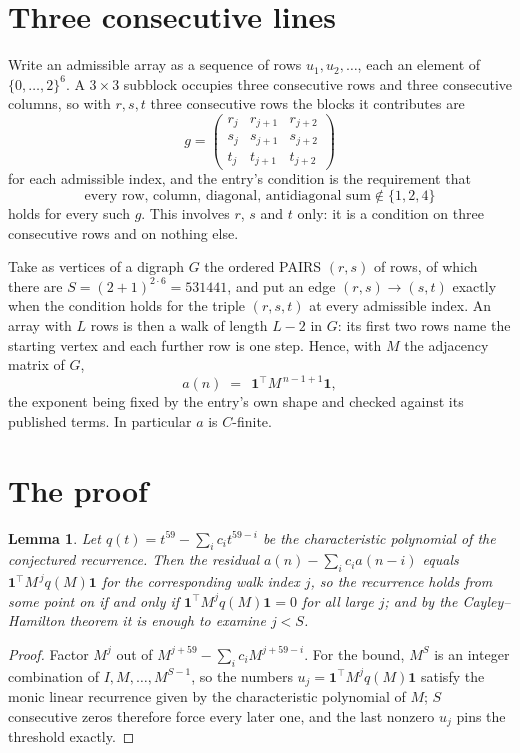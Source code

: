 \documentclass[11pt,a4paper]{article}
\theoremstyle{plain}
\newtheorem{lemma}[theorem]{Lemma}
\theoremstyle{definition}
\begin{document}
\section{Three consecutive lines}

Write an admissible array as a sequence of rows $u_1,u_2,\dots$, each an element of
$\{0,\dots,2\}^{6}$. A $3\times3$ subblock occupies three consecutive rows and
three consecutive columns, so with $r,s,t$ three consecutive rows the blocks it
contributes are
\[
g=\begin{pmatrix}r_j&r_{j+1}&r_{j+2}\\ s_j&s_{j+1}&s_{j+2}\\ t_j&t_{j+1}&t_{j+2}\end{pmatrix}
\]
for each admissible index, and the entry's condition is the requirement that
\[
\text{every row, column, diagonal, antidiagonal sum} \notin \{1,2,4\}
\]
holds for every such $g$. This involves $r$, $s$ and $t$ only: it is a condition on
three consecutive rows and on nothing else.

Take as vertices of a digraph $G$ the ordered PAIRS $(r,s)$ of rows, of which there are
$S=(2+1)^{2\cdot6}=531441$, and put an edge $(r,s)\to(s,t)$ exactly when the condition
holds for the triple $(r,s,t)$ at every admissible index. An array with $L$ rows is then a
walk of length $L-2$ in $G$: its first two rows name the starting vertex and each further
row is one step. Hence, with $M$ the adjacency matrix of $G$,
\[
a(n)\;=\;\,\mathbf{1}^{\!\top}M^{\,n-1+1}\mathbf{1},
\]
the exponent being fixed by the entry's own shape and checked against its published terms.
In particular $a$ is $C$-finite.

\section{The proof}

\begin{lemma}\label{lem:crit}
Let $q(t)=t^{59}-\sum_i c_it^{59-i}$ be the characteristic polynomial of the
conjectured recurrence. Then the residual $a(n)-\sum_ic_ia(n-i)$ equals
$\mathbf{1}^{\!\top}M^{\,j}q(M)\mathbf{1}$ for the corresponding walk index
$j$, so the recurrence holds from some point on if and only if
$\mathbf{1}^{\!\top}M^{j}q(M)\mathbf{1}=0$ for all large $j$; and by the
Cayley--Hamilton theorem it is enough to examine $j<S$.
\end{lemma}

\begin{proof}
Factor $M^{j}$ out of $M^{j+59}-\sum_ic_iM^{j+59-i}$. For the bound, $M^{S}$
is an integer combination of $I,M,\dots,M^{S-1}$, so the numbers
$u_j=\mathbf{1}^{\!\top}M^{j}q(M)\mathbf{1}$ satisfy the monic linear recurrence given by
the characteristic polynomial of $M$; $S$ consecutive zeros therefore force every later one,
and the last nonzero $u_j$ pins the threshold exactly.
\end{proof}
\end{document}
